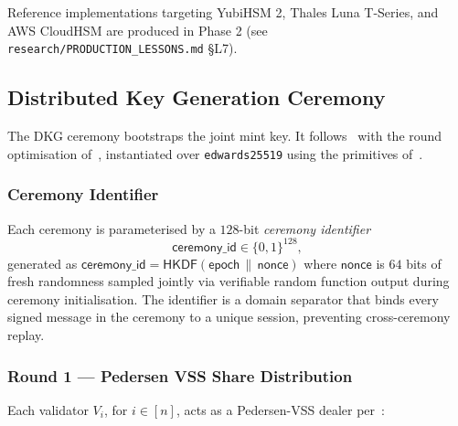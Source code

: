Reference implementations targeting YubiHSM 2, Thales Luna T-Series, and AWS CloudHSM are produced in Phase 2 (see \texttt{research/PRODUCTION\_LESSONS.md} §L7).

\subsection{Distributed Key Generation Ceremony}
\label{sec:mint-dkg}

The DKG ceremony bootstraps the joint mint key. It follows~\cite{gennaro-jarecki-krawczyk-rabin1999} with the round optimisation of~\cite{komlo-goldberg2020}, instantiated over \texttt{edwards25519} using the primitives of~.

\subsubsection{Ceremony Identifier}
\label{sec:mint-ceremony-id}

Each ceremony is parameterised by a $128$-bit \emph{ceremony identifier}
\[
  \mathsf{ceremony\_id} \in \{0,1\}^{128},
\]
generated as $\mathsf{ceremony\_id} = \mathsf{HKDF}(\mathsf{epoch} \,\|\, \mathsf{nonce})$ where $\mathsf{nonce}$ is $64$ bits of fresh randomness sampled jointly via verifiable random function output during ceremony initialisation. The identifier is a domain separator that binds every signed message in the ceremony to a unique session, preventing cross-ceremony replay.

\subsubsection{Round 1 --- Pedersen VSS Share Distribution}
\label{sec:mint-dkg-r1}

Each validator $V_i$, for $i \in [n]$, acts as a Pedersen-VSS dealer per~:

